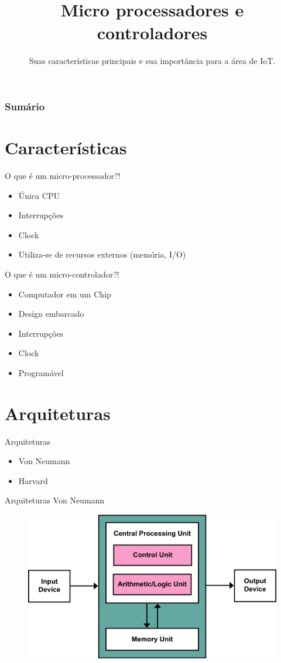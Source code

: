 \documentclass[t]{beamer}
\title{Micro processadores e controladores}
\subtitle{Suas características principais e sua importância para a área de IoT.}
\begin{document}
\frame{\titlepage}

\begin{frame}
\frametitle{Sumário}
\tableofcontents
\end{frame}

\section{Características}

\begin{frame}{O que é um micro-processador?!}
\begin{itemize}
\item Única CPU
\item Interrupções
\item Clock
\item Utiliza-se de recursos externos (memória, I/O)
\end{itemize}
\end{frame}

\begin{frame}{O que é um micro-controlador?!}
\begin{itemize}
\item Computador em um Chip
\item Design embarcado
\item Interrupções
\item Clock
\item Programável
\end{itemize}
\end{frame}

\section{Arquiteturas}

\begin{frame}{Arquiteturas}
\begin{itemize}
\item Von Neumann
\item Harvard
\end{itemize}
\end{frame}

\begin{frame}{Arquiteturas}
Von Neumann

\begin{figure}
\includegraphics[width=\linewidth]{arquiteturavonneumann}
\end{figure}
\end{frame}
\end{document}
